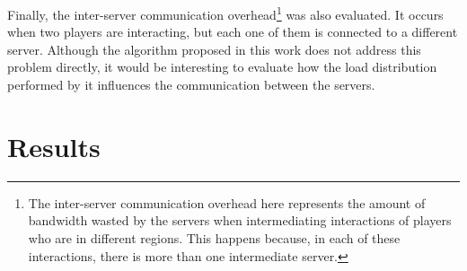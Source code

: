 \documentclass[acmjacm]{acmtrans2m}
\begin{document}
Finally, the inter-server communication overhead\footnote{The inter-server communication overhead here represents the amount of bandwidth wasted by the servers when intermediating interactions of players who are in different regions. This happens because, in each of these interactions, there is more than one intermediate server.} %
was also evaluated. It occurs when two players are interacting, but each one of them is connected to a different server. Although the algorithm proposed in this work does not address this problem directly, it would be interesting to evaluate how the load distribution performed by it influences the communication between the servers.

\section{Results}
\label{sec:result}
\end{document}
